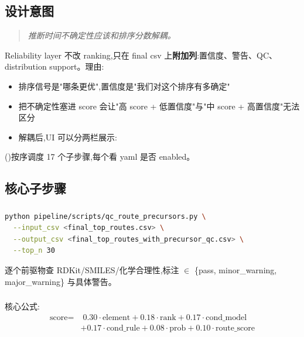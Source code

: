 \subsection{设计意图}

\begin{quote}
\itshape 推断时间不确定性应该和排序分数解耦。
\end{quote}

Reliability layer 不改 ranking,只在 final csv 上\textbf{附加列}:置信度、警告、QC、distribution support。理由:
\begin{itemize}
    \item 排序信号是"哪条更优",置信度是"我们对这个排序有多确定"
    \item 把不确定性塞进 score 会让"高 score + 低置信度"与"中 score + 高置信度"无法区分
    \item 解耦后,UI 可以分两栏展示:
\end{itemize}

()按序调度 17 个子步骤,每个看 yaml 是否 enabled。

\subsection{核心子步骤}

\subsubsection{}

\begin{lstlisting}[language=bash]
python pipeline/scripts/qc_route_precursors.py \
  --input_csv <final_top_routes.csv> \
  --output_csv <final_top_routes_with_precursor_qc.csv> \
  --top_n 30
\end{lstlisting}

逐个前驱物查 RDKit/SMILES/化学合理性,标注  $\in$ \{pass, minor\_warning, major\_warning\} 与具体警告。

\subsubsection{}

核心公式:
\begin{align}
\text{score} = & \;0.30\cdot \text{element} + 0.18\cdot \text{rank} + 0.17\cdot \text{cond\_model} \nonumber \\
& + 0.17\cdot \text{cond\_rule} + 0.08\cdot \text{prob} + 0.10\cdot \text{route\_score}
\end{align}

